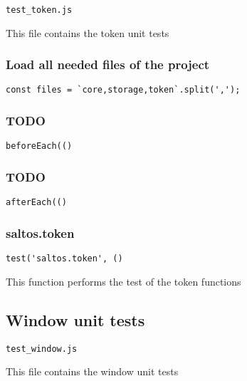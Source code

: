 \documentclass[a4paper]{article}
\begin{document}
\begin{lstlisting}
test_token.js
\end{lstlisting}

This file contains the token unit tests

\hypertarget{toc718}{}
\subsubsection{Load all needed files of the project}

\begin{lstlisting}
const files = `core,storage,token`.split(',');
\end{lstlisting}

\hypertarget{toc719}{}
\subsubsection{TODO}

\begin{lstlisting}
beforeEach(()
\end{lstlisting}

\hypertarget{toc720}{}
\subsubsection{TODO}

\begin{lstlisting}
afterEach(()
\end{lstlisting}

\hypertarget{toc721}{}
\subsubsection{saltos.token}

\begin{lstlisting}
test('saltos.token', ()
\end{lstlisting}

This function performs the test of the token functions

\hypertarget{toc722}{}
\subsection{Window unit tests}

\begin{lstlisting}
test_window.js
\end{lstlisting}

This file contains the window unit tests
\end{document}
